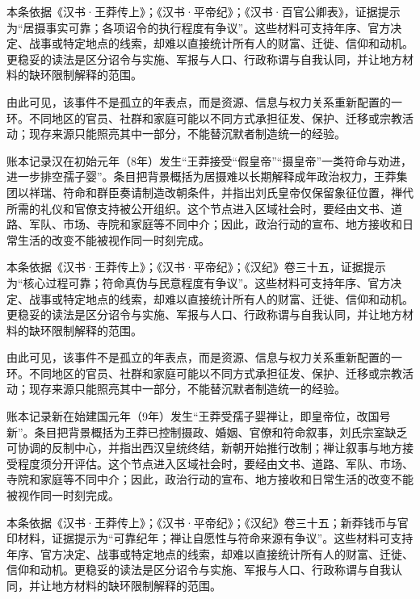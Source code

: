 本条依据《汉书·王莽传上》；《汉书·平帝纪》；《汉书·百官公卿表》，证据提示为“居摄事实可靠；各项诏令的执行程度有争议”。这些材料可支持年序、官方决定、战事或特定地点的线索，却难以直接统计所有人的财富、迁徙、信仰和动机。更稳妥的读法是区分诏令与实施、军报与人口、行政称谓与自我认同，并让地方材料的缺环限制解释的范围。

由此可见，该事件不是孤立的年表点，而是资源、信息与权力关系重新配置的一环。不同地区的官员、社群和家庭可能以不同方式承担征发、保护、迁移或宗教活动；现存来源只能照亮其中一部分，不能替沉默者制造统一的经验。

账本记录汉在初始元年（8年）发生“王莽接受“假皇帝”“摄皇帝”一类符命与劝进，进一步排空孺子婴”。条目把背景概括为居摄难以长期解释成年政治权力，王莽集团以祥瑞、符命和群臣奏请制造改朝条件，并指出刘氏皇帝仅保留象征位置，禅代所需的礼仪和官僚支持被公开组织。这个节点进入区域社会时，要经由文书、道路、军队、市场、寺院和家庭等不同中介；因此，政治行动的宣布、地方接收和日常生活的改变不能被视作同一时刻完成。

本条依据《汉书·王莽传上》；《汉书·平帝纪》；《汉纪》卷三十五，证据提示为“核心过程可靠；符命真伪与民意程度有争议”。这些材料可支持年序、官方决定、战事或特定地点的线索，却难以直接统计所有人的财富、迁徙、信仰和动机。更稳妥的读法是区分诏令与实施、军报与人口、行政称谓与自我认同，并让地方材料的缺环限制解释的范围。

由此可见，该事件不是孤立的年表点，而是资源、信息与权力关系重新配置的一环。不同地区的官员、社群和家庭可能以不同方式承担征发、保护、迁移或宗教活动；现存来源只能照亮其中一部分，不能替沉默者制造统一的经验。

账本记录新在始建国元年（9年）发生“王莽受孺子婴禅让，即皇帝位，改国号新”。条目把背景概括为王莽已控制摄政、婚姻、官僚和符命叙事，刘氏宗室缺乏可协调的反制中心，并指出西汉皇统终结，新朝开始推行改制；禅让叙事与地方接受程度须分开评估。这个节点进入区域社会时，要经由文书、道路、军队、市场、寺院和家庭等不同中介；因此，政治行动的宣布、地方接收和日常生活的改变不能被视作同一时刻完成。

本条依据《汉书·王莽传上》；《汉书·平帝纪》；《汉纪》卷三十五；新莽钱币与官印材料，证据提示为“可靠纪年；禅让自愿性与符命来源有争议”。这些材料可支持年序、官方决定、战事或特定地点的线索，却难以直接统计所有人的财富、迁徙、信仰和动机。更稳妥的读法是区分诏令与实施、军报与人口、行政称谓与自我认同，并让地方材料的缺环限制解释的范围。


